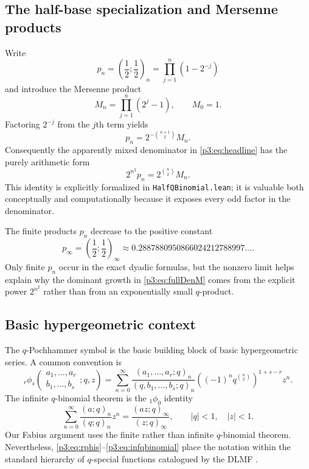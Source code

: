 \documentclass[11pt,oneside]{article}
\theoremstyle{definition}
\theoremstyle{remark}
\newcommand{\qpoch}[3]{\left(#1;#2\right)_{#3}}
\begin{document}
\subsection{The half-base specialization and Mersenne products}

Write
\begin{equation}\label{p3:eq:pn}
 p_n=\qpoch{\frac12}{\frac12}{n}
     =\prod_{j=1}^{n}(1-2^{-j})
\end{equation}
and introduce the Mersenne product
\begin{equation}\label{p3:eq:Mn}
 M_n=\prod_{j=1}^{n}(2^j-1),
 \qquad M_0=1.
\end{equation}
Factoring $2^{-j}$ from the $j$th term yields
\begin{equation}\label{p3:eq:pMersenne}
 \boxed{
 p_n=2^{-\binom{n+1}{2}}M_n.}
\end{equation}
Consequently the apparently mixed denominator in \eqref{p3:eq:headline} has the purely arithmetic form
\begin{equation}\label{p3:eq:fullDenM}
 \boxed{
 2^{n^2}p_n=2^{\binom n2}M_n.}
\end{equation}
This identity is explicitly formalized in \texttt{HalfQBinomial.lean}; it is valuable both conceptually and computationally because it exposes every odd factor in the denominator.

The finite products $p_n$ decrease to the positive constant
\[
  p_\infty=\qpoch{\frac12}{\frac12}{\infty}
  \approx0.2887880950866024212788997\ldots.
\]
Only finite $p_n$ occur in the exact dyadic formulas, but the nonzero limit helps explain why the dominant growth in \eqref{p3:eq:fullDenM} comes from the explicit power $2^{n^2}$ rather than from an exponentially small $q$-product.

\subsection{Basic hypergeometric context}

The $q$-Pochhammer symbol is the basic building block of basic hypergeometric series.  A common convention is
\begin{equation}\label{p3:eq:rphis}
 {}_r\phi_s\!\left(
 \begin{matrix}a_1,\ldots,a_r\\ b_1,\ldots,b_s\end{matrix};q,z\right)
 =\sum_{n=0}^{\infty}
 \frac{\qpoch{a_1,\ldots,a_r}{q}{n}}
      {\qpoch{q,b_1,\ldots,b_s}{q}{n}}
 \left((-1)^nq^{\binom n2}\right)^{1+s-r}z^n.
\end{equation}
The infinite $q$-binomial theorem is the ${}_1\phi_0$ identity
\begin{equation}\label{p3:eq:infqbinomial}
 \sum_{n=0}^{\infty}
 \frac{\qpoch{a}{q}{n}}{\qpoch{q}{q}{n}}z^n
 =\frac{\qpoch{az}{q}{\infty}}{\qpoch{z}{q}{\infty}},
 \qquad |q|<1,\quad |z|<1.
\end{equation}
Our Fabius argument uses the finite rather than infinite $q$-binomial theorem.  Nevertheless, \eqref{p3:eq:rphis}--\eqref{p3:eq:infqbinomial} place the notation within the standard hierarchy of $q$-special functions catalogued by the DLMF \cite{p3:DLMF17}.
\end{document}
